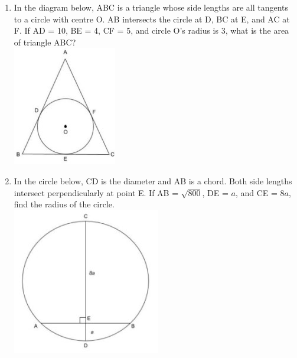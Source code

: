 \documentclass[12pt]{extarticle}
\begin{document}
\begin{enumerate}
    \item {In the diagram below, ABC is a triangle whose side lengths are all tangents to a circle with centre O. AB intersects the circle at D, BC at E, and AC at F. If AD = 10, BE = 4, CF = 5, and circle O's radius is 3, what is the area of triangle ABC?\\
    \includegraphics{April_18_Q4}}
    \item {In the circle below, CD is the diameter and AB is a chord. Both side lengths intersect perpendicularly at point E. If AB = $\sqrt{800}$, DE = {$a$}, and CE = {$8a$}, find the radius of the circle.\\
    \includegraphics{April_18_Q5}}
\end{enumerate}
\end{document}
